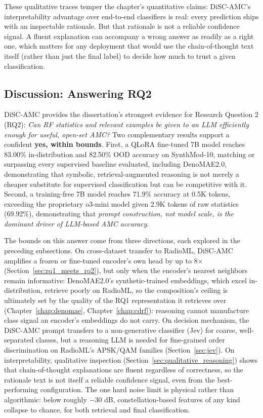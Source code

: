 These qualitative traces temper the chapter's quantitative claims: DiSC-AMC's interpretability advantage over end-to-end classifiers is real: every prediction ships with an inspectable rationale. But that rationale is not a reliable confidence signal. A fluent explanation can accompany a wrong answer as readily as a right one, which matters for any deployment that would use the chain-of-thought text itself (rather than just the final label) to decide how much to trust a given classification.

\subsection{Discussion: Answering RQ2}
\label{sec:disc_discussion}

DiSC-AMC provides the dissertation's strongest evidence for Research Question 2 (RQ2): \textit{Can RF statistics and relevant examples be given to an LLM efficiently enough for useful, open-set AMC?} Two complementary results support a confident \textbf{yes, within bounds}. First, a QLoRA fine-tuned 7B model reaches 83.00\% in-distribution and 82.50\% OOD accuracy on SynthMod-10, matching or surpassing every supervised baseline evaluated, including DenoMAE2.0, demonstrating that symbolic, retrieval-augmented reasoning is not merely a cheaper substitute for supervised classification but can be competitive with it. Second, a training-free 7B model reaches 71.9\% accuracy at 0.5K tokens, exceeding the proprietary o3-mini model given 2.9K tokens of raw statistics (69.92\%), demonstrating that \emph{prompt construction, not model scale, is the dominant driver of LLM-based AMC accuracy}.

The bounds on this answer come from three directions, each explored in the preceding subsections. On cross-dataset transfer to RadioML, DiSC-AMC amplifies a frozen or fine-tuned encoder's own head by up to 8$\times$ (Section~\ref{sec:rq1_meets_rq2}), but only when the encoder's nearest neighbors remain informative: DenoMAE2.0's synthetic-trained embeddings, which excel in-distribution, retrieve poorly on RadioML, so the composition's ceiling is ultimately set by the quality of the RQ1 representation it retrieves over (Chapter~\ref{chap:denomae}, Chapter~\ref{chap:cdrf}): reasoning cannot manufacture class signal an encoder's embeddings do not carry. On decision mechanism, the DiSC-AMC prompt transfers to a non-generative classifier (Jev) for coarse, well-separated classes, but a reasoning LLM is needed for fine-grained order discrimination on RadioML's APSK/QAM families (Section~\ref{sec:jev}). On interpretability, qualitative inspection (Section~\ref{sec:qualitative_reasoning}) shows that chain-of-thought explanations are fluent regardless of correctness, so the rationale text is not itself a reliable confidence signal, even from the best-performing configuration. The one hard noise limit is physical rather than algorithmic: below roughly $-30$ dB, constellation-based features of any kind collapse to chance, for both retrieval and final classification.

